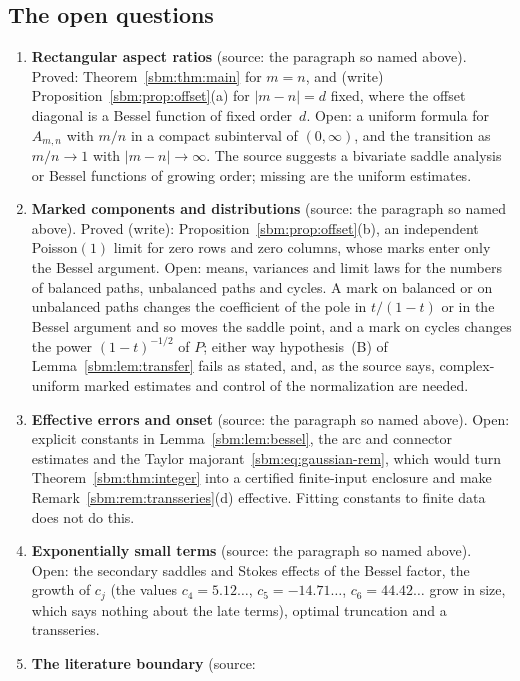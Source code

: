 \documentclass[11pt,letterpaper]{article}
\numberwithin{equation}{section}
\theoremstyle{remark}\newtheorem{remark}[theorem]{Remark}
\begin{document}
\subsection*{The open questions}
\begin{enumerate}
\item\label{sbm:q:rectangular} \textbf{Rectangular aspect ratios} (source:
 the paragraph so named above). Proved: Theorem~\ref{sbm:thm:main} for $m=n$,
 and (write) Proposition~\ref{sbm:prop:offset}(a) for $|m-n|=d$ fixed, where
 the offset diagonal is a Bessel function of fixed order~$d$. Open: a uniform
 formula for $A_{m,n}$ with $m/n$ in a compact subinterval of $(0,\infty)$,
 and the transition as $m/n\to1$ with $|m-n|\to\infty$. The source suggests a
 bivariate saddle analysis or Bessel functions of growing order; missing are
 the uniform estimates.
\item\label{sbm:q:marked} \textbf{Marked components and distributions}
 (source: the paragraph so named above). Proved (write):
 Proposition~\ref{sbm:prop:offset}(b), an independent Poisson$(1)$ limit for
 zero rows and zero columns, whose marks enter only the Bessel argument. Open:
 means, variances and limit laws for the numbers of balanced paths,
 unbalanced paths and cycles. A mark on balanced or on unbalanced paths
 changes the coefficient of the pole in $t/(1-t)$ or in the Bessel argument
 and so moves the saddle point, and a mark on cycles changes the power
 $(1-t)^{-1/2}$ of $P$; either way hypothesis~(B) of
 Lemma~\ref{sbm:lem:transfer} fails as stated, and, as the source says,
 complex-uniform marked estimates and control of the normalization are
 needed.
\item\label{sbm:q:effective} \textbf{Effective errors and onset} (source: the
 paragraph so named above). Open: explicit constants in
 Lemma~\ref{sbm:lem:bessel}, the arc and connector estimates and the Taylor
 majorant~\eqref{sbm:eq:gaussian-rem}, which would turn
 Theorem~\ref{sbm:thm:integer} into a certified finite-input enclosure and
 make Remark~\ref{sbm:rem:transseries}(d) effective. Fitting constants to
 finite data does not do this.
\item\label{sbm:q:exponential} \textbf{Exponentially small terms} (source:
 the paragraph so named above). Open: the secondary saddles and Stokes effects
 of the Bessel factor, the growth of $c_j$ (the values $c_4=5.12\ldots$,
 $c_5=-14.71\ldots$, $c_6=44.42\ldots$ grow in size, which says nothing
 about the late terms), optimal truncation and a transseries.
\item\label{sbm:q:literature} \textbf{The literature boundary} (source:

\end{enumerate}
\end{document}
